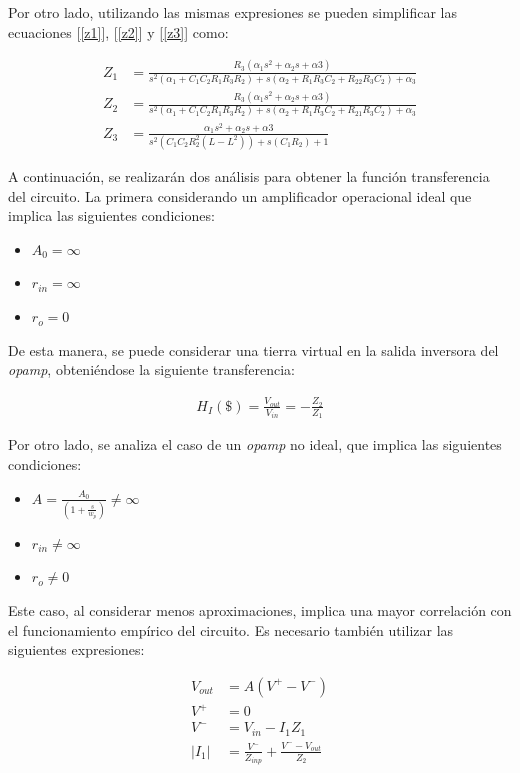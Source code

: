 Por otro lado, utilizando las mismas expresiones se pueden simplificar las ecuaciones 
[\ref{z1}],  [\ref{z2}] y [\ref{z3}] como:

\vspace{2mm}
\begin{align}
	Z_1 &= \frac{R_3(\alpha_1s^2+\alpha_2s+\alpha3)}{s^2(\alpha_1+C_1C_2R_1R_3R_2)+s(\alpha_2+R_1R_3C_2+R_{22}R_3C_2)+\alpha_3} \label{z1_simplificado} \\ 	
	Z_2 &= \frac{R_3(\alpha_1s^2+\alpha_2s+\alpha3)}{s^2(\alpha_1+C_1C_2R_1R_3R_2)+s(\alpha_2+R_1R_3C_2+R_{21}R_3C_2)+\alpha_3} \label{z2_simplificado} \\ 	
	Z_3 &= \frac{\alpha_1s^2+\alpha_2s+\alpha3}{s^2(C_1C_2R_2^2(L-L^2))+s(C_1R_2)+1} \label{z3_simplificado}  	
\end{align}
\vspace{2mm}

A continuación, se realizarán dos análisis para obtener la función transferencia 
del circuito. La primera considerando un amplificador operacional ideal 
que implica las siguientes condiciones:

\begin{itemize}
	\item $A_{0}=\infty$
	\item $r_{in}=\infty$	
	\item $r_{o}=0$
\end{itemize}
De esta manera, se puede considerar una tierra virtual en la salida 
inversora del \textit{opamp}, obteniéndose la siguiente transferencia:

\begin{align}
	H_I(\$)=\frac{V_{out}}{V_{in}}=-\frac{Z_{2}}{Z_{1}}
	\label{trans_ideal}
\end{align}
 \vspace{2mm}

 Por otro lado, se analiza el caso de un \textit{opamp} no ideal, que 
 implica las siguientes condiciones:
 \begin{itemize}
	\item $A=\frac{A_{0}}{\left(1+\frac{s}{w_p}\right)}\neq\infty$
	\item $r_{in}\neq\infty$	
	\item $r_{o}\neq0$	
\end{itemize}
Este caso, al considerar menos aproximaciones, implica una mayor correlación 
con el funcionamiento empírico del circuito. Es necesario también 
utilizar las siguientes expresiones:

\begin{align}
	V_{out} & = A(V^+-V^-) \\
	V^+ & = 0 \\
	V^- & = V_{in} - I_1Z_1\\
	|I_1| & = \frac{V^-}{Z_{inp}} + \frac{V^--V_{out}}{Z_2}
\end{align} 
\vspace{2mm}

